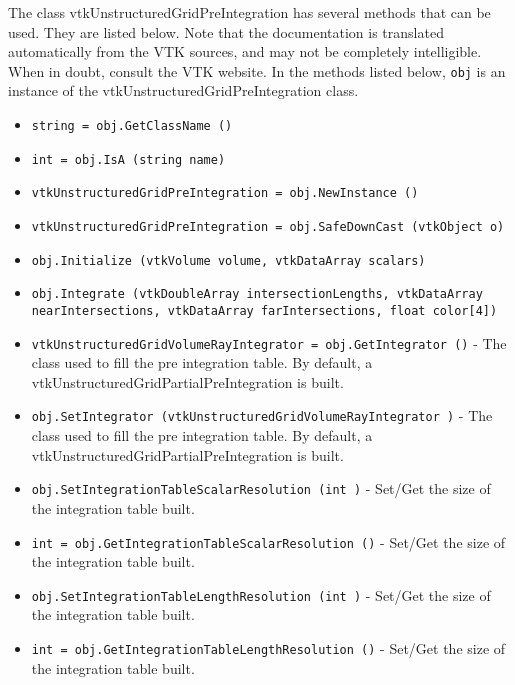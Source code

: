 The class vtkUnstructuredGridPreIntegration has several methods that can be used.
  They are listed below.
Note that the documentation is translated automatically from the VTK sources,
and may not be completely intelligible.  When in doubt, consult the VTK website.
In the methods listed below, \verb|obj| is an instance of the vtkUnstructuredGridPreIntegration class.
\begin{itemize}
\item  \verb|string = obj.GetClassName ()|

\item  \verb|int = obj.IsA (string name)|

\item  \verb|vtkUnstructuredGridPreIntegration = obj.NewInstance ()|

\item  \verb|vtkUnstructuredGridPreIntegration = obj.SafeDownCast (vtkObject o)|

\item  \verb|obj.Initialize (vtkVolume volume, vtkDataArray scalars)|

\item  \verb|obj.Integrate (vtkDoubleArray intersectionLengths, vtkDataArray nearIntersections, vtkDataArray farIntersections, float color[4])|

\item  \verb|vtkUnstructuredGridVolumeRayIntegrator = obj.GetIntegrator ()| -  The class used to fill the pre integration table.  By default, a
 vtkUnstructuredGridPartialPreIntegration is built.

\item  \verb|obj.SetIntegrator (vtkUnstructuredGridVolumeRayIntegrator )| -  The class used to fill the pre integration table.  By default, a
 vtkUnstructuredGridPartialPreIntegration is built.

\item  \verb|obj.SetIntegrationTableScalarResolution (int )| -  Set/Get the size of the integration table built.

\item  \verb|int = obj.GetIntegrationTableScalarResolution ()| -  Set/Get the size of the integration table built.

\item  \verb|obj.SetIntegrationTableLengthResolution (int )| -  Set/Get the size of the integration table built.

\item  \verb|int = obj.GetIntegrationTableLengthResolution ()| -  Set/Get the size of the integration table built.


\end{itemize}
